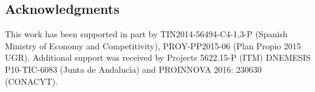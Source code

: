 \documentclass{sig-alternate}
\begin{document}
\subsection*{Acknowledgments}
 
This work has been supported in part by
TIN2014-56494-C4-{1,3}-P (Spanish Ministry of Economy and
Competitivity), PROY-PP2015-06 (Plan Propio 2015 UGR). Additional
support was received by 
Projects 5622.15-P (ITM) DNEMESIS P10-TIC-6083 (Junta de
Andaluc\'{\i}a) and PROINNOVA 2016: 230630 (CONACYT). 



\end{document}
